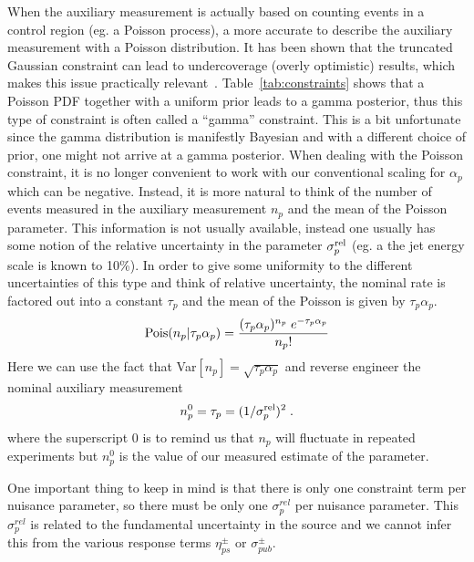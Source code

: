 \documentclass{cernrep}
\newcommand{\Pois}{{\ensuremath{\rm Pois}}}
\begin{document}

When the auxiliary measurement is actually based on counting events in a control region (eg. a Poisson process), a more accurate to describe the auxiliary measurement with a Poisson distribution.  It has been shown that the truncated Gaussian constraint can lead to undercoverage (overly optimistic) results, which makes this issue practically relevant~\cite{Cousins:2008zz}.  Table~\ref{tab:constraints} shows that a Poisson PDF together with a uniform prior leads to a gamma posterior, thus this type of constraint is often called a ``gamma'' constraint.  This is a bit unfortunate since the gamma distribution is manifestly Bayesian and with a different choice of prior, one might not arrive at a gamma posterior.  When dealing with the Poisson constraint, it is no longer convenient to work with  our conventional scaling for $\alpha_p$ which can be negative.  Instead, it is more natural to think of the number of events measured in the auxiliary measurement $n_p$ and the mean of the Poisson parameter.  This information is not usually available, instead one usually has some notion of the relative uncertainty in the parameter $\sigma_p^{\rm rel}$ (eg. a the jet energy scale is known to 10\%).  In order to give some uniformity to the different uncertainties of this type and think of relative uncertainty, the nominal rate is factored out into a constant $\tau_p$ and the mean of the Poisson is given by $\tau_p \alpha_p$.  
\begin{equation}
\Pois(n_p | \tau_p \alpha_p) =\frac{ (\tau_p \alpha_p)^{n_p} \; e^{-\tau_p \alpha_p} } {n_p!}
\end{equation}
Here we can use the fact that Var$[n_p]=\sqrt{\tau_p\alpha_p}$ and reverse engineer the nominal auxiliary measurement 
\begin{equation}
n_p^0 =  \tau_p = (1/\sigma_{p}^{\rm rel})^2\; .
\end{equation}
where the superscript $0$ is to remind us that $n_p$ will fluctuate in repeated experiments but $n_p^0$ is the value of our measured estimate of the parameter.

One important thing to keep in mind is that there is only one constraint term per nuisance parameter, so there must be only one $\sigma_p^{rel}$ per nuisance parameter.  This $\sigma_p^{rel}$ is related to the fundamental uncertainty in the source and we cannot infer this from the various response terms $\eta_{ps}^\pm$ or $\sigma_{pub}^\pm$. 
\end{document}
